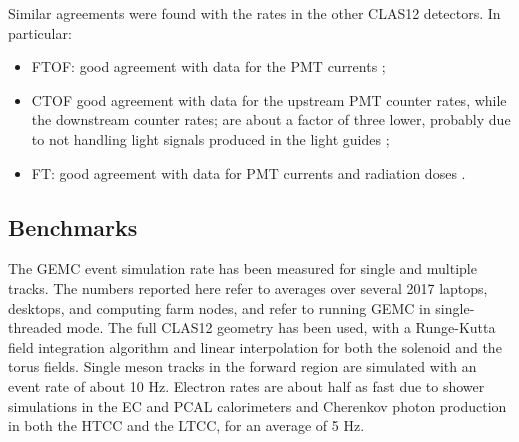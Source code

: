 


Similar agreements were found with the rates in the other CLAS12 detectors. In particular:

\begin{itemize}
	\item FTOF: good agreement with data for the PMT currents \cite{ftof-nim};
	\item CTOF good agreement with data for the upstream PMT counter rates, while the downstream counter rates;
		  are about a factor of three lower, probably due to not handling light signals produced in the light guides \cite{ctof-nim};
	\item FT: good agreement with data for PMT currents and radiation doses \cite{ft-nim}.
\end{itemize}


\subsection{Benchmarks}

The GEMC event simulation rate has been measured for single and multiple tracks. The numbers reported here
refer to averages over several 2017 laptops, desktops, and computing farm nodes, and refer to running GEMC in single-threaded mode.
The full CLAS12 geometry has been used, with a Runge-Kutta field integration algorithm
and linear interpolation for both the solenoid and the torus fields.
Single meson tracks in the forward region are simulated with an event rate of about 10 Hz.
Electron rates are about half as fast due to shower simulations in the EC and PCAL calorimeters and
Cherenkov photon production in both the HTCC and the LTCC, for an average of 5 Hz.

